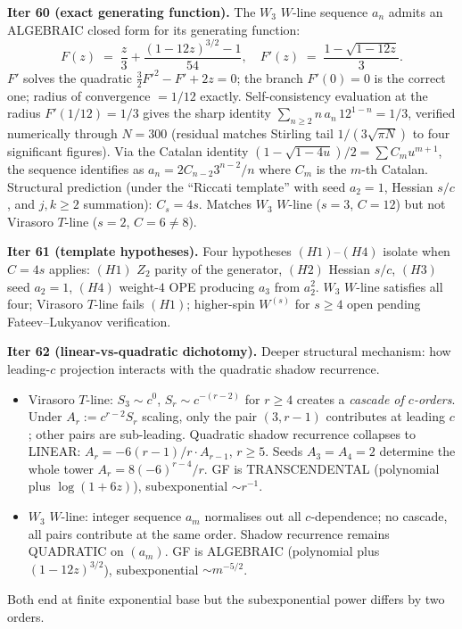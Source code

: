 \documentclass[11pt]{article}
\begin{document}
\textbf{Iter 60 (exact generating function).} The $W_3$ $W$-line
sequence $a_n$ admits an ALGEBRAIC closed form for its
generating function:
\[
  F(z) \;=\; \frac{z}{3} + \frac{(1 - 12 z)^{3/2} - 1}{54},
  \quad
  F'(z) \;=\; \frac{1 - \sqrt{1 - 12 z}}{3}.
\]
$F'$ solves the quadratic $\tfrac{3}{2} F'^2 - F' + 2 z = 0$;
the branch $F'(0) = 0$ is the correct one; radius of convergence
$= 1/12$ exactly. Self-consistency evaluation at the radius
$F'(1/12) = 1/3$ gives the sharp identity
$\sum_{n \ge 2} n \, a_n \, 12^{1-n} = 1/3$, verified numerically
through $N = 300$ (residual matches Stirling tail
$1/(3\sqrt{\pi N})$ to four significant figures).
Via the Catalan identity $(1 - \sqrt{1-4u})/2 = \sum C_m u^{m+1}$,
the sequence identifies as $a_n = 2 C_{n-2} 3^{n-2} / n$ where
$C_m$ is the $m$-th Catalan. Structural prediction (under the
``Riccati template'' with seed $a_2 = 1$, Hessian $s/c$, and
$j, k \ge 2$ summation): $C_s = 4 s$. Matches $W_3$ $W$-line
($s = 3$, $C = 12$) but not Virasoro $T$-line
($s = 2$, $C = 6 \ne 8$).

\textbf{Iter 61 (template hypotheses).} Four hypotheses
$(H1)$--$(H4)$ isolate when $C = 4s$ applies:
$(H1)$ $Z_2$ parity of the generator, $(H2)$ Hessian $s/c$,
$(H3)$ seed $a_2 = 1$, $(H4)$ weight-$4$ OPE producing $a_3$
from $a_2^2$. $W_3$ $W$-line satisfies all four; Virasoro
$T$-line fails $(H1)$; higher-spin $W^{(s)}$ for $s \ge 4$
open pending Fateev--Lukyanov verification.

\textbf{Iter 62 (linear-vs-quadratic dichotomy).} Deeper
structural mechanism: how leading-$c$ projection interacts
with the quadratic shadow recurrence.
\begin{itemize}
  \item Virasoro $T$-line: $S_3 \sim c^0$, $S_r \sim
        c^{-(r-2)}$ for $r \ge 4$ creates a \emph{cascade of
        $c$-orders}. Under $A_r := c^{r-2} S_r$ scaling, only
        the pair $(3, r-1)$ contributes at leading $c$; other
        pairs are sub-leading. Quadratic shadow recurrence
        collapses to LINEAR: $A_r = -6(r-1)/r \cdot A_{r-1}$,
        $r \ge 5$. Seeds $A_3 = A_4 = 2$ determine the whole
        tower $A_r = 8(-6)^{r-4}/r$. GF is TRANSCENDENTAL
        (polynomial plus $\log(1 + 6z)$), subexponential
        $\sim r^{-1}$.
  \item $W_3$ $W$-line: integer sequence $a_m$ normalises out
        all $c$-dependence; no cascade, all pairs contribute
        at the same order. Shadow recurrence remains QUADRATIC
        on $(a_m)$. GF is ALGEBRAIC (polynomial plus
        $(1 - 12 z)^{3/2}$), subexponential $\sim m^{-5/2}$.
\end{itemize}
Both end at finite exponential base but the subexponential
power differs by two orders.
\end{document}
